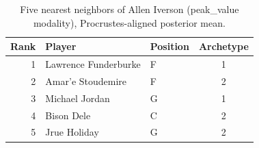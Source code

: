 \begin{table}[htbp]
  \centering\small
  \begin{tabular}{rllc}
    \toprule
    Rank & Player & Position & Archetype \\
    \midrule
    1 & Lawrence Funderburke & F & 1 \\
    2 & Amar'e Stoudemire & F & 2 \\
    3 & Michael Jordan & G & 1 \\
    4 & Bison Dele & C & 2 \\
    5 & Jrue Holiday & G & 2 \\
    \bottomrule
  \end{tabular}
  \caption{Five nearest neighbors of Allen Iverson (peak_value modality), Procrustes-aligned posterior mean.}
  \label{tab:Allen_Iverson_neighbors_peak_value}
\end{table}

